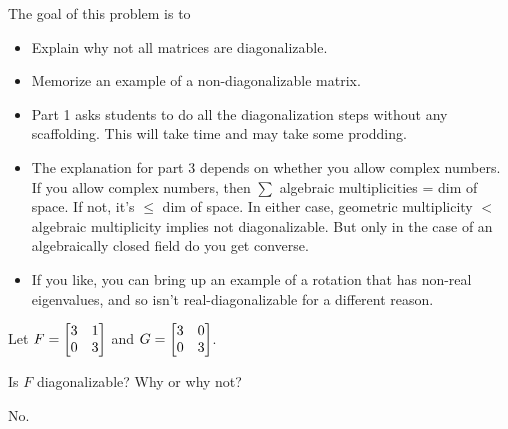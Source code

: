 \documentclass{workbook}
\newcommand{\displayonlynewpage}{\begin{displayonly}\newpage\end{displayonly}}
\newcommand{\bookonlynewpage}{\begin{bookonly}\newpage\end{bookonly}}
\begin{document}
\begin{slide}
	\bookonlynewpage
	\displayonlynewpage

	\question
	\begin{annotation}
		\begin{goals}

			The goal of this problem is to
			\begin{itemize}
				\item Explain why not all matrices are diagonalizable.
				\item Memorize an example of a non-diagonalizable matrix.
			\end{itemize}
		\end{goals}

		\begin{notes}
			\begin{itemize}
				\item Part 1 asks students to do all the diagonalization steps
					without any scaffolding. This will take time and may take
					some prodding.
				\item The explanation for part 3 depends on whether you allow complex numbers.
					If you allow complex numbers, then $\sum$ algebraic multiplicities = dim
					of space. If not, it's $\leq$ dim of space. In either case, geometric
					multiplicity $<$ algebraic multiplicity implies not diagonalizable.
					But only in the case of an algebraically closed field do you get
					converse.
				\item If you like, you can bring up an example of a rotation that has non-real
					eigenvalues, and so isn't real-diagonalizable for a different reason.
			\end{itemize}
		\end{notes}
	\end{annotation}
	Let $F=\mat{3&1\\0&3}$ and $G=\mat{3&0\\0&3}$.
	\begin{parts}
		\item Is $F$ diagonalizable?  Why or why not?
			\begin{solution}
				No.


\end{solution}
\end{parts}
\end{slide}
\end{document}
